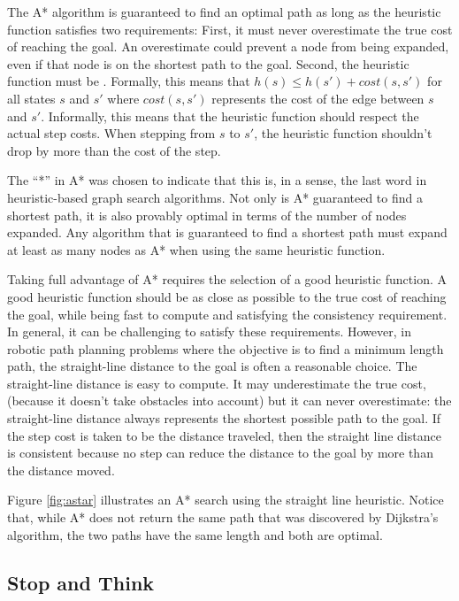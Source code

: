 The A* algorithm is guaranteed to find an optimal path as long as the
heuristic function satisfies two requirements: First, it must never
overestimate the true cost of reaching the goal.  An overestimate
could prevent a node from being expanded, even if that node is on the
shortest path to the goal.  Second, the heuristic function must be
.  Formally, this means that $h(s) \leq h(s') + cost(s,
s')$ for all states $s$ and $s'$ where $cost(s, s')$ represents the
cost of the edge between $s$ and $s'$.  Informally, this means that
the heuristic function should respect the actual step costs.  When
stepping from $s$ to $s'$, the heuristic function shouldn't drop by
more than the cost of the step.

The ``*'' in A* was chosen to indicate that this is, in a sense, the
last word in heuristic-based graph search algorithms.  Not only is A*
guaranteed to find a shortest path, it is also provably optimal in
terms of the number of nodes expanded.  Any algorithm that is
guaranteed to find a shortest path must expand at least as many nodes
as A* when using the same heuristic function.

Taking full advantage of A* requires the selection of a good heuristic
function. A good heuristic function should be as close as possible to
the true cost of reaching the goal, while being fast to compute and
satisfying the consistency requirement.  In general, it can be
challenging to satisfy these requirements.  However, in robotic path
planning problems where the objective is to find a minimum length
path, the straight-line distance to the goal is often a reasonable
choice.  The straight-line distance is easy to compute. It may
underestimate the true cost, (because it doesn't take obstacles into
account) but it can never overestimate: the straight-line distance
always represents the shortest possible path to the goal.  If the step
cost is taken to be the distance traveled, then the straight line
distance is consistent because no step can reduce the distance to the
goal by more than the distance moved.

Figure \ref{fig:astar} illustrates an A* search using the straight
line heuristic.  Notice that, while A* does not return the same path
that was discovered by Dijkstra's algorithm, the two paths have the
same length and both are optimal.

\subsection*{Stop and Think}

